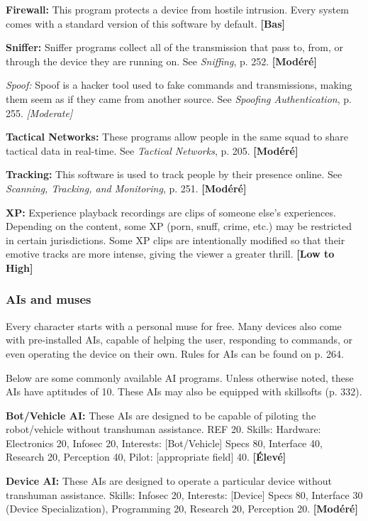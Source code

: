 {{\textbf{Firewall:} This program protects a device from hostile intrusion. Every system comes with a standard version of this software by default. \textbf{[Bas]} 

\textbf{Sniffer:} Sniffer programs collect all of the transmission that pass to, from, or through the device they are running on. See \emph{Sniffing}, p. 252. \textbf{[Modéré]} 

\emph{Spoof:} Spoof is a hacker tool used to fake commands and transmissions, making them seem as if they came from another source. See \emph{Spoofing Authentication}, p. 255. \emph{[Moderate]} 

\textbf{Tactical Networks:} These programs allow people in the same squad to share tactical data in real-time. See \emph{Tactical Networks}, p. 205. \textbf{[Modéré]} 

\textbf{Tracking:} This software is used to track people by their presence online. See \emph{Scanning, Tracking, and Monitoring}, p. 251. \textbf{[Modéré]} 

\textbf{XP:} Experience playback recordings are clips of someone else’s experiences. Depending on the content, some XP (porn, snuff, crime, etc.) may be restricted in certain jurisdictions. Some XP clips are intentionally modified so that their emotive tracks are more intense, giving the viewer a greater thrill. \textbf{[Low to High]} 

\subsubsection{AIs and muses} 

Every character starts with a personal muse for free. Many devices also come with pre-installed AIs, capable of helping the user, responding to commands, or even operating the device on their own. Rules for AIs can be found on p. 264. 

Below are some commonly available AI programs. Unless otherwise noted, these AIs have aptitudes of 10. These AIs may also be equipped with skillsofts (p. 332). 

\textbf{Bot/Vehicle AI:} These AIs are designed to be capable of piloting the robot/vehicle without transhuman assistance. REF 20. Skills: Hardware: Electronics 20, Infosec 20, Interests: [Bot/Vehicle] Specs 80, Interface 40, Research 20, Perception 40, Pilot: [appropriate field] 40. \textbf{[Élevé]} 

\textbf{Device AI:} These AIs are designed to operate a particular device without transhuman assistance. Skills: Infosec 20, Interests: [Device] Specs 80, Interface 30 (Device Specialization), Programming 20, Research 20, Perception 20. \textbf{[Modéré]} 

}}

